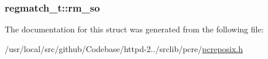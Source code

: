 \subsubsection[{\texorpdfstring{rm\+\_\+so}{rm_so}}]{ regmatch\+\_\+t\+::rm\+\_\+so}\hypertarget{structregmatch__t_a90ac8973d256eaffdbb20de676ff45a4}{}\label{structregmatch__t_a90ac8973d256eaffdbb20de676ff45a4}


The documentation for this struct was generated from the following file\+:\begin{DoxyCompactItemize}
\item 
/usr/local/src/github/\+Codebase/httpd-\/2../srclib/pcre/\hyperlink{pcreposix_8h}{pcreposix.\+h}\end{DoxyCompactItemize}
